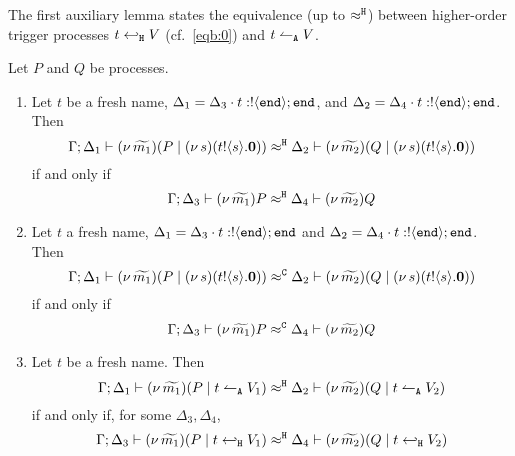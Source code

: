 \noindent
The first auxiliary lemma states the equivalence (up to $\approx^\mathtt{H}$) between
higher-order trigger processes $t \hookleftarrow_{\mathtt{H}} V$ (cf.~\eqref{eqb:0}) and $t \leftharpoonup_\mathtt{A} V$.
\begin{lemma}
\label{l:altrig}
Let $P$ and $Q$ be processes.
	\label{lem:alt_tr}
	\begin{enumerate}
		\item	Let $t$ be a fresh name, $\Delta_1 = \Delta_3 \cdot t: ! \langle \mathtt{end} \rangle ; \mathtt{end}$, and
				$\Delta_2 = \Delta_4 \cdot t: ! \langle \mathtt{end} \rangle ; \mathtt{end}$. Then
				\[
					\Gamma; \Delta_1 \vdash (\nu\, \widetilde{m_1})(P \;|\; (\nu\, s)(t ! \langle s \rangle . \mathbf{0})  )  \approx^\mathtt{H} \Delta_2 \vdash (\nu\, \widetilde{m_2})(Q \;|\; (\nu\, s)(t ! \langle s \rangle . \mathbf{0})  )
				\]
				if and only if%
				\[
					\Gamma; \Delta_3 \vdash (\nu\, \widetilde{m_1})P   \approx^\mathtt{H} \Delta_4 \vdash (\nu\, \widetilde{m_2})Q
				\]

		\item	Let $t$ a fresh name, $\Delta_1 = \Delta_3 \cdot t: ! \langle \mathtt{end} \rangle ; \mathtt{end}$ and
				$\Delta_2 = \Delta_4 \cdot t: ! \langle \mathtt{end} \rangle ; \mathtt{end}$. Then
				\[
					\Gamma; \Delta_1 \vdash (\nu\, \widetilde{m_1})(P \;|\; (\nu\, s)(t ! \langle s \rangle . \mathbf{0})  )  \approx^\mathtt{C} \Delta_2 \vdash (\nu\, \widetilde{m_2})(Q \;|\; (\nu\, s)(t ! \langle s \rangle . \mathbf{0})  )
				\]
				if and only if%
				\[
					\Gamma; \Delta_3 \vdash (\nu\, \widetilde{m_1})P \approx^\mathtt{C} \Delta_4 \vdash (\nu\, \widetilde{m_2})Q
				\]

		\item	Let $t$ be a fresh name. Then
				\[
					\Gamma; \Delta_1 \vdash (\nu\, \widetilde{m_1})(P \;|\; t \leftharpoonup_\mathtt{A} V_1  )  \approx^\mathtt{H} \Delta_2 \vdash (\nu\, \widetilde{m_2})(Q \;|\; t \leftharpoonup_\mathtt{A} V_2  )
				\]
				if and only if, for some $\Delta_3, \Delta_4$, 
				\[
					\Gamma; \Delta_3 \vdash (\nu\, \widetilde{m_1})(P \;|\; t \hookleftarrow_{\mathtt{H}} V_1  )  \approx^\mathtt{H} \Delta_4 \vdash (\nu\, \widetilde{m_2})(Q \;|\; t \hookleftarrow_{\mathtt{H}} V_2)
				\]
	\end{enumerate}
\end{lemma}

